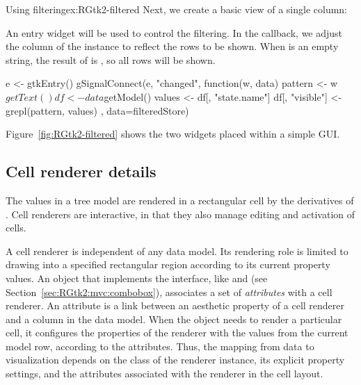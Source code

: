 \begin{example}{Using filtering}{ex:RGtk2-filtered}
Next, we create a basic view of a single column:
\begin{Schunk}
\end{Schunk}

An entry widget will be used to control the filtering. In the
callback, we adjust the  column of the
 instance to reflect the rows to be shown. When
 is an empty string, the result of  is 
, so all rows will be shown.
\begin{Schunk}
\begin{Sinput}
 e <- gtkEntry()
 gSignalConnect(e, "changed", function(w, data) {
   pattern <- w$getText()
   df <- data$getModel()
   values <- df[, "state.name"]
   df[, "visible"] <- grepl(pattern, values)
 }, data=filteredStore)
\end{Sinput}
\end{Schunk}


Figure~\ref{fig:RGtk2-filtered} shows the two widgets placed within a
simple GUI.
\end{example}

\subsection{Cell renderer details}
\label{sec:RGtk2:cellrenderers}

The values in a tree model are rendered in a rectangular cell by the
derivatives of . Cell renderers are
interactive, in that they also manage editing and activation of cells.

A cell renderer is independent of any data model. Its rendering role
is limited to drawing into a specified rectangular region according to
its current property values. An object that implements the
 interface, like  and
 (see Section~\ref{sec:RGtk2:mvc:combobox}),
associates a set of \emph{attributes} with a cell renderer. An
attribute is a link between an aesthetic property of a cell renderer
and a column in the data model. When the  object
needs to render a particular cell, it configures the properties of the
renderer with the values from the current model row, according to the
attributes. Thus, the mapping from data to visualization depends on
the class of the renderer instance, its explicit property settings,
and the attributes associated with the renderer in the cell layout.

